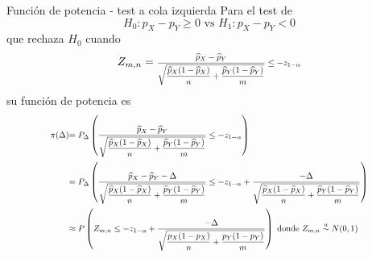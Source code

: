 \documentclass{beamer}
\theoremstyle{definition}
\newcommand\scalemath[2]{\scalebox{#1}{\mbox{\ensuremath{\displaystyle #2}}}}
\begin{document}
\begin{frame}{\color{rosee} Funci\'on de potencia - test a cola izquierda}
    \small
Para el test de
$$
H_0: p_X-p_Y \geq 0 \text { vs } H_1: p_X-p_Y<0
$$
que rechaza $H_0$ cuando
$$Z_{m,n}=\scalemath{0.75}{
\dfrac{\widehat{p}_X -
         \widehat{p}_Y}{\sqrt{\dfrac{\widehat{p}_X(1-\widehat{p}_X)}{n}+\dfrac{\widehat{p}_Y(1-\widehat{p}_Y)}{m}}}\leq -z_{1-\alpha}}
$$
su funci\'on de potencia es
$$
\begin{aligned}\scalemath{0.75}{
\pi(\Delta)} &\scalemath{0.75}{=P_{\Delta}\left(\dfrac{\widehat{p}_X -
         \widehat{p}_Y}{\sqrt{\dfrac{\widehat{p}_X(1-\widehat{p}_X)}{n}+\dfrac{\widehat{p}_Y(1-\widehat{p}_Y)}{m}}} \leq -z_{1-\alpha}\right)} \\
&\scalemath{0.75}{=P_{\Delta}\left(\dfrac{\widehat{p}_X -\widehat{p}_Y-\Delta}{\sqrt{\dfrac{\widehat{p}_X(1-\widehat{p}_X)}{n}+\dfrac{\widehat{p}_Y(1-\widehat{p}_Y)}{m}}} \leq -z_{1-\alpha}+\frac{-\Delta}{\sqrt{\dfrac{\widehat{p}_X(1-\widehat{p}_X)}{n}+\dfrac{\widehat{p}_Y(1-\widehat{p}_Y)}{m}}}\right)} \\
& \scalemath{0.75}{\approx P\left(Z_{m,n} \leq -z_{1- \alpha}+\frac{-\Delta}{\sqrt{\dfrac{p_X(1-p_X)}{n}+\dfrac{p_Y(1-p_Y)}{m}}}\right) \text { donde } Z_{m,n}\stackrel{a}{\sim} N(0,1)} 
\end{aligned}
$$
\end{frame}
\end{document}
